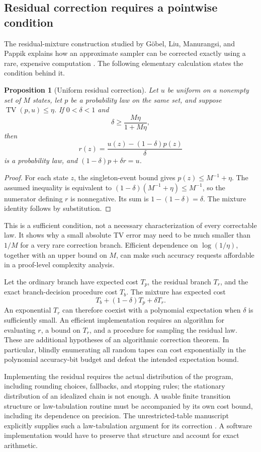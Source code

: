 \documentclass[11pt]{article}
\newtheorem{proposition}{Proposition}
\newcommand{\TV}{\operatorname{TV}}
\begin{document}
\subsection{Residual correction requires a pointwise condition}
The residual-mixture construction studied by G\"obel, Liu, Manurangsi, and Pappik explains how an approximate sampler can be corrected exactly using a rare, expensive computation \cite{GLMP2024}. The following elementary calculation states the condition behind it.

\begin{proposition}[Uniform residual correction]
Let \(u\) be uniform on a nonempty set of \(M\) states, let \(p\) be a probability law on the same set, and suppose \(\TV(p,u)\leq\eta\).
If \(0<\delta<1\) and
\[
 \delta\geq\frac{M\eta}{1+M\eta},
\]
then
\[
 r(z)=\frac{u(z)-(1-\delta)p(z)}{\delta}
\]
is a probability law, and \((1-\delta)p+\delta r=u\).
\end{proposition}
\begin{proof}
For each state \(z\), the singleton-event bound gives
\(p(z)\leq M^{-1}+\eta\). The assumed inequality is equivalent to
\((1-\delta)(M^{-1}+\eta)\leq M^{-1}\), so the numerator defining \(r\) is nonnegative. Its sum is \(1-(1-\delta)=\delta\). The mixture identity follows by substitution.
\end{proof}

This is a sufficient condition, not a necessary characterization of every correctable law. It shows why a small absolute TV error may need to be much smaller than \(1/M\) for a very rare correction branch. Efficient dependence on \(\log(1/\eta)\), together with an upper bound on \(M\), can make such accuracy requests affordable in a proof-level complexity analysis.

Let the ordinary branch have expected cost \(T_p\), the residual branch \(T_r\), and the exact branch-decision procedure cost \(T_b\). The mixture has expected cost
\[
 T_b+(1-\delta)T_p+\delta T_r.
\]
An exponential \(T_r\) can therefore coexist with a polynomial expectation when \(\delta\) is sufficiently small. An efficient implementation requires an algorithm for evaluating \(r\), a bound on \(T_r\), and a procedure for sampling the residual law. These are additional hypotheses of an algorithmic correction theorem. In particular, blindly enumerating all random tapes can cost exponentially in the polynomial accuracy-bit budget and defeat the intended expectation bound.

Implementing the residual requires the actual distribution of the program, including rounding choices, fallbacks, and stopping rules; the stationary distribution of an idealized chain is not enough. A usable finite transition structure or law-tabulation routine must be accompanied by its own cost bound, including its dependence on precision. The unrestricted-table manuscript explicitly supplies such a law-tabulation argument for its correction \cite{oaiTables}. A software implementation would have to preserve that structure and account for exact arithmetic.
\end{document}
